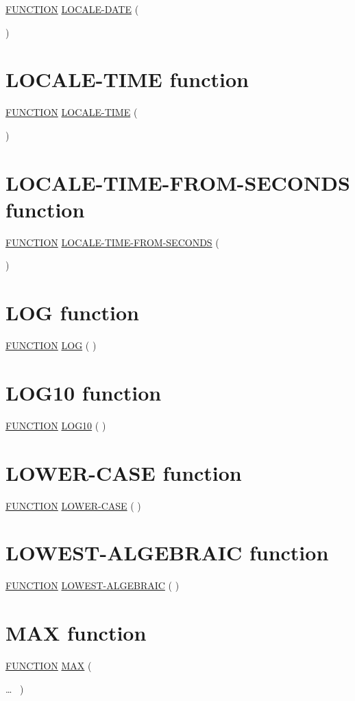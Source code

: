 \documentclass[a4paper,oneside,svgnames]{scrbook}
\makeatletter
\newcommand{\key}[1]{\underline{#1}}
\newenvironment{0-1}{$\left[ \begin{tabular}{@{}l@{}}}{\end{tabular} \right]$}
\newenvironment{1=}{$\left\{ \begin{tabular}{@{}l@{}}}{\end{tabular} \right\}$}
\makeatother
\begin{document}
\key{FUNCTION} \key{LOCALE-DATE} ( \argument
\begin{0-1}
  \argument
\end{0-1}
)

\section{LOCALE-TIME function}

\key{FUNCTION} \key{LOCALE-TIME} ( \argument
\begin{0-1}
  \argument
\end{0-1}
)

\section{LOCALE-TIME-FROM-SECONDS function}

\key{FUNCTION} \key{LOCALE-TIME-FROM-SECONDS} ( \argument
\begin{0-1}
  \argument
\end{0-1}
)

\section{LOG function}

\key{FUNCTION} \key{LOG} ( \argument )

\section{LOG10 function}

\key{FUNCTION} \key{LOG10} ( \argument )

\section{LOWER-CASE function}

\key{FUNCTION} \key{LOWER-CASE} ( \argument )

\section{LOWEST-ALGEBRAIC function}

\key{FUNCTION} \key{LOWEST-ALGEBRAIC} ( \argument )

\section{MAX function}

\key{FUNCTION} \key{MAX} (
\begin{1=}
  \argument
\end{1=}\ldots
\ {})
\end{document}
